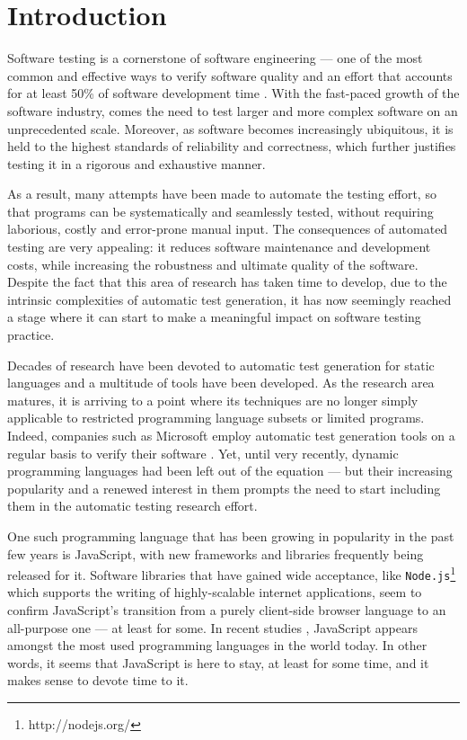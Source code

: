 \chapter{Introduction}
\pagestyle{plain}
\setcounter{page}{1}
Software testing is a cornerstone of software engineering --- one of the most common and effective ways to verify software quality and an effort that accounts for at least 50\% of software development time \cite{tahbildar2automated}. With the fast-paced growth of the software industry, comes the need to test larger and more complex software on an unprecedented scale. Moreover, as software becomes increasingly ubiquitous, it is held to the highest standards of reliability and correctness, which further justifies testing it in a rigorous and exhaustive manner.

As a result, many attempts have been made to automate the testing effort, so that programs can be systematically and seamlessly tested, without requiring laborious, costly and error-prone manual input. The consequences of automated testing are very appealing: it reduces software maintenance and development costs, while increasing the robustness and ultimate quality of the software. Despite the fact that this area of research has taken time to develop, due to the intrinsic complexities of automatic test generation, it has now seemingly reached a stage where it can start to make a meaningful impact on software testing practice.

Decades of research have been devoted to automatic test generation for static languages and a multitude of tools have been developed. As the research area matures, it is arriving to a point where its techniques are no longer simply applicable to restricted programming language subsets or limited programs. Indeed, companies such as Microsoft employ automatic test generation tools on a regular basis to verify their software \cite{păsăreanu2009survey}. Yet, until very recently, dynamic programming languages had been left out of the equation --- but their increasing popularity and a renewed interest in them prompts the need to start including them in the automatic testing research effort.

One such programming language that has been growing in popularity in the past few years is JavaScript, with new frameworks and libraries frequently being released for it. Software libraries that have gained wide acceptance, like \texttt{Node.js}\footnote{http://nodejs.org/} which supports the writing of highly-scalable internet applications, seem to confirm JavaScript's transition from a purely client-side browser language to an all-purpose one --- at least for some. In recent studies \cite{website:langpop}, JavaScript appears amongst the most used programming languages in the world today. In other words, it seems that JavaScript is here to stay, at least for some time, and it makes sense to devote time to it.

